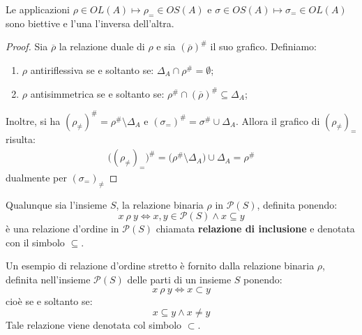 \begin{propbox}
	Le applicazioni $\rho \in OL(A) \mapsto \rho_{=} \in OS(A)$ e $\sigma \in OS(A) \mapsto \sigma_{=} \in OL(A)$ sono biettive e l'una l'inversa dell'altra.
\end{propbox}

\begin{proof}
	Sia $\overline{\rho}$ la relazione duale di $\rho$ e sia $(\overline{\rho})^{\#}$ il suo grafico. Definiamo:
	\begin{enumerate}
		\item $\rho$ antiriflessiva se e soltanto se: $\Delta_{A} \cap \rho^{\#} = \emptyset$;
		\item $\rho$ antisimmetrica se e soltanto se: $\rho^{\#} \cap (\overline{\rho})^{\#} \subseteq \Delta_{A}$;
	\end{enumerate}
	Inoltre, si ha $(\rho_{\neq})^{\#} = \rho^{\#} \setminus \Delta_{A}$ e $(\sigma_{=})^{\#} = \sigma^{\#} \cup \Delta_{A}$. Allora il grafico di $(\rho_{\neq})_{=}$ risulta:
	\begin{align*}
		\bigl((\rho_{\neq})_{=}\bigr)^{\#} = \bigl(\rho^{\#} \setminus \Delta_{A}\bigr) \cup \Delta_{A}= \rho^{\#}
	\end{align*}
	dualmente per $(\sigma_{=})_{\neq}$
\end{proof}



\begin{osservation}
	Qualunque sia l'insieme $S$, la relazione binaria $\rho$ in $\mathcal{P}(S)$, definita ponendo:
	\begin{displaymath}
		x \ \rho \ y \Leftrightarrow x,y \in \mathcal{P}(S) \wedge x \subseteq y
	\end{displaymath}
	è una relazione d'ordine in $\mathcal{P}(S)$ chiamata \textbf{relazione di inclusione} e denotata con il simbolo $\subseteq$.
\end{osservation}


\begin{example}
	Un esempio di relazione d'ordine stretto è fornito dalla relazione binaria $\rho$, definita nell'insieme $\mathcal{P}(S)$ delle parti di un insieme $S$ ponendo:
	\begin{displaymath}
		x \ \rho \ y \Leftrightarrow x \subset y
	\end{displaymath}
	cioè se e soltanto se:
	\begin{displaymath}
		x \subseteq y \wedge x \neq y
	\end{displaymath}
	Tale relazione viene denotata col simbolo $\subset$.
\end{example}

